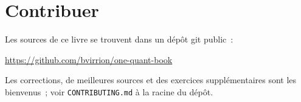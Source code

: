 \section*{Contribuer}

Les sources de ce livre se trouvent dans un dépôt git public~:
\begin{center}
\url{https://github.com/bvirrion/one-quant-book}
\end{center}
Les corrections, de meilleures sources et des exercices supplémentaires sont
les bienvenus~; voir \texttt{CONTRIBUTING.md} à la racine du dépôt.


